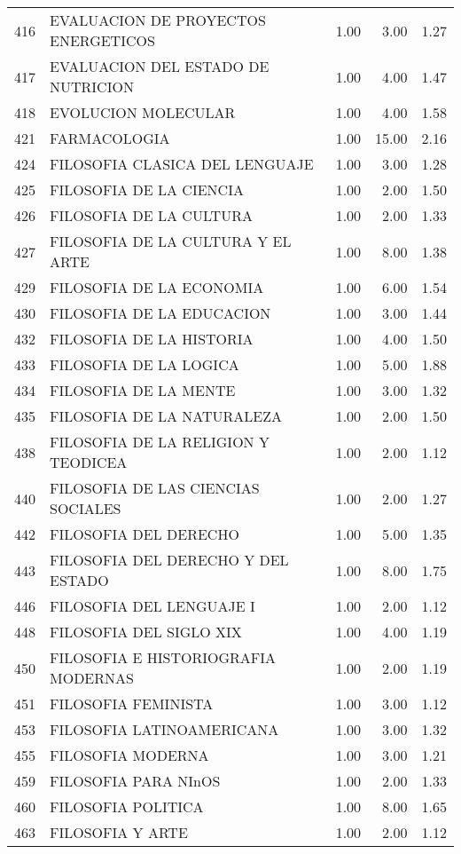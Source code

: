 \begin{table}[ht]
\begin{tabular}{rlrrr}
  416 & EVALUACION DE PROYECTOS ENERGETICOS & 1.00 & 3.00 & 1.27 \\ 
  417 & EVALUACION DEL ESTADO DE NUTRICION & 1.00 & 4.00 & 1.47 \\ 
  418 & EVOLUCION MOLECULAR & 1.00 & 4.00 & 1.58 \\ 
  421 & FARMACOLOGIA & 1.00 & 15.00 & 2.16 \\ 
  424 & FILOSOFIA CLASICA DEL LENGUAJE & 1.00 & 3.00 & 1.28 \\ 
  425 & FILOSOFIA DE LA CIENCIA & 1.00 & 2.00 & 1.50 \\ 
  426 & FILOSOFIA DE LA CULTURA & 1.00 & 2.00 & 1.33 \\ 
  427 & FILOSOFIA DE LA CULTURA Y EL ARTE & 1.00 & 8.00 & 1.38 \\ 
  429 & FILOSOFIA DE LA ECONOMIA & 1.00 & 6.00 & 1.54 \\ 
  430 & FILOSOFIA DE LA EDUCACION & 1.00 & 3.00 & 1.44 \\ 
  432 & FILOSOFIA DE LA HISTORIA & 1.00 & 4.00 & 1.50 \\ 
  433 & FILOSOFIA DE LA LOGICA & 1.00 & 5.00 & 1.88 \\ 
  434 & FILOSOFIA DE LA MENTE & 1.00 & 3.00 & 1.32 \\ 
  435 & FILOSOFIA DE LA NATURALEZA & 1.00 & 2.00 & 1.50 \\ 
  438 & FILOSOFIA DE LA RELIGION Y TEODICEA & 1.00 & 2.00 & 1.12 \\ 
  440 & FILOSOFIA DE LAS CIENCIAS SOCIALES & 1.00 & 2.00 & 1.27 \\ 
  442 & FILOSOFIA DEL DERECHO & 1.00 & 5.00 & 1.35 \\ 
  443 & FILOSOFIA DEL DERECHO Y DEL ESTADO & 1.00 & 8.00 & 1.75 \\ 
  446 & FILOSOFIA DEL LENGUAJE I & 1.00 & 2.00 & 1.12 \\ 
  448 & FILOSOFIA DEL SIGLO XIX & 1.00 & 4.00 & 1.19 \\ 
  450 & FILOSOFIA E HISTORIOGRAFIA MODERNAS & 1.00 & 2.00 & 1.19 \\ 
  451 & FILOSOFIA FEMINISTA & 1.00 & 3.00 & 1.12 \\ 
  453 & FILOSOFIA LATINOAMERICANA & 1.00 & 3.00 & 1.32 \\ 
  455 & FILOSOFIA MODERNA & 1.00 & 3.00 & 1.21 \\ 
  459 & FILOSOFIA PARA NInOS & 1.00 & 2.00 & 1.33 \\ 
  460 & FILOSOFIA POLITICA & 1.00 & 8.00 & 1.65 \\ 
  463 & FILOSOFIA Y ARTE & 1.00 & 2.00 & 1.12 \\ 

\end{tabular}
\end{table}
